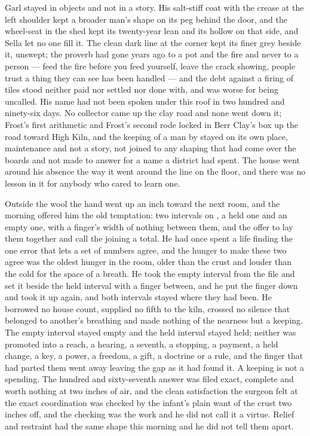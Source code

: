 Garl stayed in objects and not in a story. His salt-stiff coat with the crease at the left shoulder kept a broader man's shape on its peg behind the door, and the wheel-seat in the shed kept its twenty-year lean and its hollow on that side, and Sella let no one fill it. The clean dark line at the corner kept its finer grey beside it, unswept; the proverb had gone years ago to a pot and the fire and never to a person --- feed the fire before you feed yourself, leave the crack showing, people trust a thing they can see has been handled --- and the debt against a firing of tiles stood neither paid nor settled nor done with, and was worse for being uncalled. His name had not been spoken under this roof in two hundred and ninety-six days. No collector came up the clay road and none went down it; Frost's first arithmetic and Frost's second rode locked in Berr Clay's box up the road toward High Kiln, and the keeping of a man by  stayed on its own place, maintenance and not a story, not joined to any shaping that had come over the boards and not made to answer for a name a district had spent. The house went around his absence the way it went around the line on the floor, and there was no lesson in it for anybody who cared to learn one.

\scenebreak

Outside the wool the hand went up an inch toward the next room, and the morning offered him the old temptation: two intervals on , a held one and an empty one, with a finger's width of nothing between them, and the offer to lay them together and call the joining a total. He had once spent a life finding the one error that lets a set of numbers agree, and the hunger to make these two agree was the oldest hunger in the room, older than the crust and louder than the cold for the space of a breath. He took the empty interval from the file and set it beside the held interval with a finger between, and he put the finger down and took it up again, and both intervals stayed where they had been. He borrowed no house count, supplied no fifth to the kiln, crossed no silence that belonged to another's breathing and made nothing of the nearness but a keeping. The empty interval stayed empty and the held interval stayed held; neither was promoted into a reach, a hearing, a seventh, a stopping, a payment, a held change, a key, a power, a freedom, a gift, a doctrine or a rule, and the finger that had parted them went away leaving the gap as it had found it. A keeping is not a spending. The hundred and sixty-seventh answer was filed exact, complete and worth nothing at two inches of air, and the clean satisfaction the surgeon felt at the exact coordination was checked by the infant's plain want of the crust two inches off, and the checking was the work and he did not call it a virtue. Relief and restraint had the same shape this morning and he did not tell them apart.

